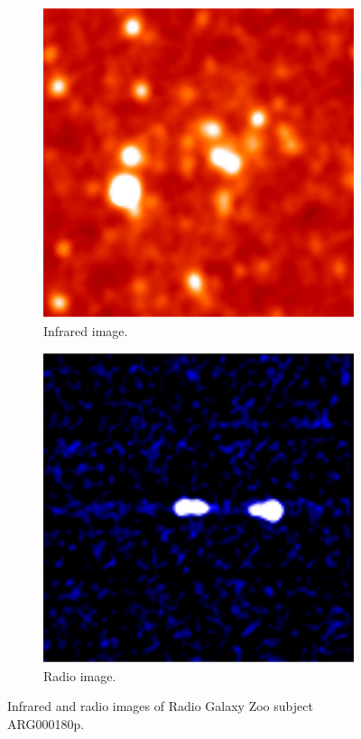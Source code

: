 \documentclass[a4paper]{article}
\begin{document}
        \begin{figure}[!ht]
            \center
            \begin{subfigure}{0.3\textwidth}
                \includegraphics[width=\textwidth]{images/ARG000180p_ir.jpg}
                \caption{Infrared image.}
            \end{subfigure}
            \quad
            \begin{subfigure}{0.3\textwidth}
                \includegraphics[width=\textwidth]{images/ARG000180p_radio.jpg}
                \caption{Radio image.}
            \end{subfigure}
            \caption{Infrared and radio images of Radio Galaxy Zoo subject ARG000180p.}
        \end{figure}
\end{document}
